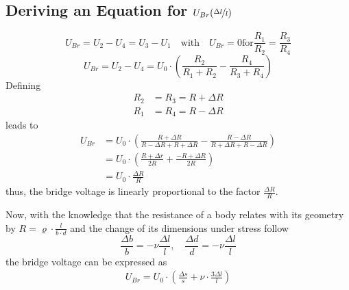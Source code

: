         \subsection{Deriving an Equation for \( U_{Br}(\nicefrac[]{\Delta l}{l}) \)}\label{sec:A4 equation for full bridge circuit}%
            \begin{equation}
                U_{Br} = U_2 - U_4 = U_3 - U_1 \quad \text{with} \quad U_{Br} = 0 \text{for} \frac{R_1}{R_2} = \frac{R_3}{R_4}
            \end{equation}
            \begin{equation}
                U_{Br} = U_2 - U_4 = U_0 \cdot \left(\frac{R_2}{R_1 + R_2} - \frac{R_4}{R_3 + R_4}\right)
            \end{equation}
            Defining
            \begin{align}
                R_2 &= R_3 = R + \Delta R \\
                R_1 &= R_4 = R - \Delta R
            \end{align}
            leads to
            \begin{align}
                U_{Br}  &= U_0 \cdot \left(\frac{R + \Delta R}{R - \Delta R + R + \Delta R} - \frac{R - \Delta R}{R + \Delta R + R - \Delta R}\right) \nonumber \\
                        &= U_0 \cdot \left(\frac{R+\Delta r}{2R} + \frac{-R + \Delta R}{2R}\right) \nonumber \\
                        &= U_0 \cdot \frac{\Delta R}{R}
                \label{eq:Ubr and delta R}
            \end{align}
            thus, the bridge voltage is linearly proportional to the factor \( \frac{\Delta R}{R} \).\par
            Now, with the knowledge that the resistance of a body relates with its geometry by
            \( R = \varrho \cdot \frac{l}{b \cdot d} \) and the change of its dimensions under stress follow
            \begin{equation}
                \frac{\Delta b}{b} = -\nu \frac{\Delta l}{l}, \quad \frac{\Delta d}{d} = -\nu \frac{\Delta l}{l}
            \end{equation}
            the bridge voltage can be expressed as
            \begin{align}
                U_{Br} = U_0 \cdot \left( \frac{\Delta s}{s} + \nu \cdot \frac{3 \Delta l}{l}\right)
            \end{align}
